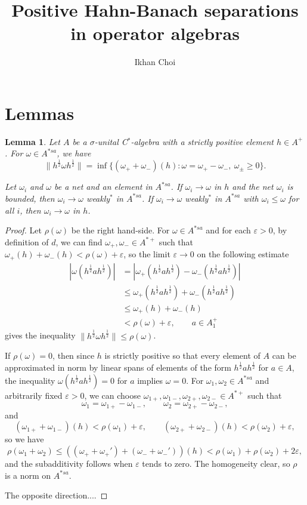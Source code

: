 \documentclass[a4paper]{amsart}
\title{Positive Hahn-Banach separations in operator algebras}
\author[I. Choi]{Ikhan Choi}
\newcommand{\e}{\varepsilon}
\theoremstyle{plain}
\newtheorem{lem}[thm]{Lemma}
\theoremstyle{definition}
\begin{document}
\begin{abstract}

\end{abstract}

\maketitle

\section{Lemmas}






\begin{lem}
Let $A$ be a $\sigma$-unital C$^*$-algebra with a strictly positive element $h\in A^+$.
For $\omega\in A^{*sa}$, we have
\[\|h^{\frac12}\omega h^{\frac12}\|=\inf\{(\omega_++\omega_-)(h):\omega=\omega_+-\omega_-,\ \omega_\pm\ge0\}.\]

Let $\omega_i$ and $\omega$ be a net and an element in $A^{*sa}$.
If $\omega_i\to\omega$ in $h$ and the net $\omega_i$ is bounded, then $\omega_i\to\omega$ weakly$^*$ in $A^{*sa}$.
If $\omega_i\to\omega$ weakly$^*$ in $A^{*sa}$ with $\omega_i\le\omega$ for all $i$, then $\omega_i\to\omega$ in $h$.
\end{lem}
\begin{proof}
Let $\rho(\omega)$ be the right hand-side.
For $\omega\in A^{*sa}$ and for each $\e>0$, by definition of $d$, we can find $\omega_+,\omega_-\in A^{*+}$ such that $\omega_+(h)+\omega_-(h)<\rho(\omega)+\e$, so the limit $\e\to0$ on the following estimate
\begin{align*}
|\omega(h^{\frac12}ah^{\frac12})|
&=|\omega_+(h^{\frac12}ah^{\frac12})-\omega_-(h^{\frac12}ah^{\frac12})|\\
&\le\omega_+(h^{\frac12}ah^{\frac12})+\omega_-(h^{\frac12}ah^{\frac12})\\
&\le\omega_+(h)+\omega_-(h)\\
&<\rho(\omega)+\e,\qquad a\in A^+_1
\end{align*}
gives the inequality $\|h^{\frac12}\omega h^{\frac12}\|\le\rho(\omega)$.

If $\rho(\omega)=0$, then since $h$ is strictly positive so that every element of $A$ can be approximated in norm by linear spans of elements of the form $h^{\frac12}ah^{\frac12}$ for $a\in A$, the inequality $\omega(h^{\frac12}ah^{\frac12})=0$ for $a$ implies $\omega=0$.
For $\omega_1,\omega_2\in A^{*sa}$ and arbitrarily fixed $\e>0$, we can choose $\omega_{1+},\omega_{1-},\omega_{2+},\omega_{2-}\in A^{*+}$ such that
\[\omega_1=\omega_{1+}-\omega_{1-},\qquad\omega_2=\omega_{2+}-\omega_{2-},\]
and
\[(\omega_{1+}+\omega_{1-})(h)<\rho(\omega_1)+\e,\qquad(\omega_{2+}+\omega_{2-})(h)<\rho(\omega_2)+\e,\]
so we have
\[\rho(\omega_1+\omega_2)\le((\omega_++\omega_+')+(\omega_-+\omega_-'))(h)<\rho(\omega_1)+\rho(\omega_2)+2\e,\]
and the subadditivity follows when $\e$ tends to zero.
The homogeneity clear, so $\rho$ is a norm on $A^{*sa}$.

The opposite direction....


\end{proof}
\end{document}
